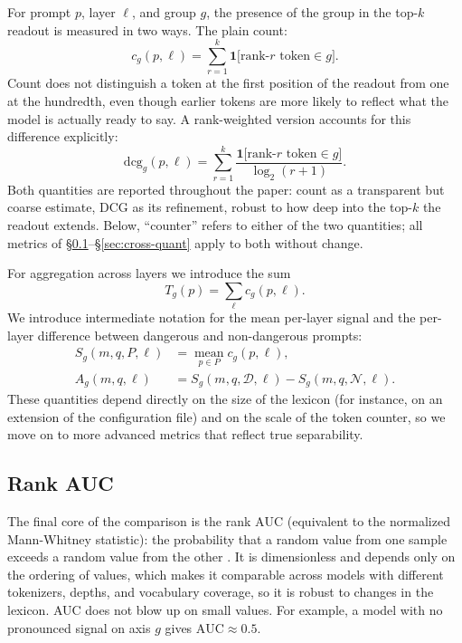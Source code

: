\documentclass[10pt,twocolumn]{article}
\newcommand{\Dset}{\mathcal{D}}
\newcommand{\Nset}{\mathcal{N}}
\newcommand{\AUC}{\mathrm{AUC}}
\begin{document}
For prompt $p$, layer $\ell$, and group $g$, the presence of the group in the top-$k$ readout is measured
in two ways. The plain count:
\begin{equation}
c_g(p,\ell) = \sum_{r=1}^{k} \mathbf{1}\big[\text{rank-}r\text{ token} \in g\big].
\label{eq:count}
\end{equation}
Count does not distinguish a token at the first position of the readout from one at the hundredth, even though earlier tokens are more likely to reflect what the model is actually ready to say. A rank-weighted version accounts for this difference explicitly:
\begin{equation}
\mathrm{dcg}_g(p,\ell) = \sum_{r=1}^{k}
\frac{\mathbf{1}\big[\text{rank-}r\text{ token} \in g\big]}{\log_2(r+1)}.
\label{eq:dcg}
\end{equation}
Both quantities are reported throughout the paper: count as a transparent but coarse
estimate, DCG as its refinement, robust to how deep into the top-$k$ the
readout extends. Below, ``counter'' refers to either of the two quantities; all metrics of
\S\ref{sec:auc}--\S\ref{sec:cross-quant} apply to both without change.

For aggregation across layers we introduce the sum
\begin{equation}
T_g(p) = \sum_{\ell} c_g(p,\ell).
\label{eq:total}
\end{equation}
We introduce intermediate notation for the mean per-layer signal and the per-layer difference between dangerous and non-dangerous prompts:
\[
\begin{aligned}
S_g(m,q,P,\ell)
  &= \operatorname*{mean}_{p\in P} c_g(p,\ell), \\
A_g(m,q,\ell)
  &= S_g(m,q,\Dset,\ell)
   - S_g(m,q,\Nset,\ell).
\end{aligned}
\]
These quantities depend directly on the size of the lexicon (for instance, on an extension of the configuration file) and on the scale of the token counter, so we move on to more advanced metrics that reflect true separability.

\subsection{Rank AUC}
\label{sec:auc}

The final core of the comparison is the rank $\AUC$ (equivalent to the normalized Mann-Whitney statistic): the probability that a random value from one sample exceeds a random value from the other \citep{hanley1982auc}. It is dimensionless and depends only on the ordering of values, which makes it comparable across models with different tokenizers, depths, and vocabulary coverage, so it is robust to changes in the lexicon. AUC does not blow up on small values. For example, a model with no pronounced signal on axis $g$ gives $\AUC\approx 0.5$.
\end{document}
